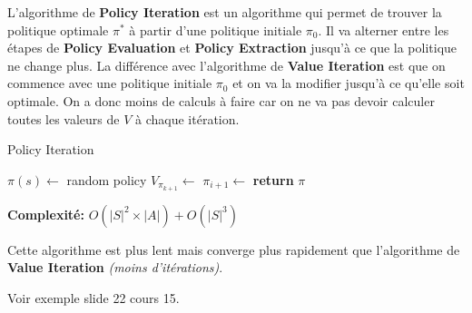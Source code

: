 L'algorithme de \textbf{Policy Iteration} est un algorithme qui permet de trouver la politique optimale $\pi^*$ à partir d'une politique initiale $\pi_0$. 
Il va alterner entre les étapes de \textbf{Policy Evaluation} et \textbf{Policy Extraction} jusqu'à ce que la politique ne change plus. 
La différence avec l'algorithme de \textbf{Value Iteration} est que on commence avec une politique initiale $\pi_0$ et on va la modifier jusqu'à ce qu'elle soit optimale. 
On a donc moins de calculs à faire car on ne va pas devoir calculer toutes les valeurs de $V$ à chaque itération. 

\begin{algorithm}[H]
    \caption{Policy Iteration}\label{alg:policyiteration}
    \begin{algorithmic}[1]
            \State $\pi(s) \gets$ random policy
            \Repeat
            \State $V_\pi_{k+1} \gets$ 
            \State $\pi_{i+1} \gets$ 
            \State \textbf{return} $\pi$
        \EndProcedure
    \end{algorithmic} 
\end{algorithm}

\textbf{Complexité:} $O(|S|^2 \times |A|) + O(|S|^3)$

Cette algorithme est plus lent mais converge plus rapidement que l'algorithme de \textbf{Value Iteration} \textit{(moins d'itérations)}.

\begin{remark}\leavevmode
    Voir exemple slide 22 cours 15.
\end{remark}












